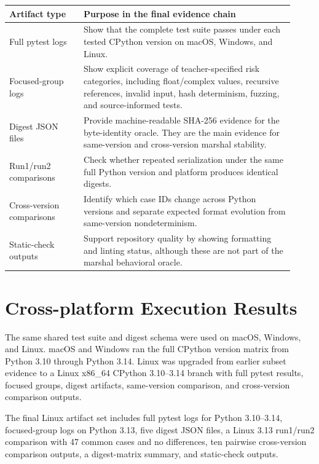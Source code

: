 \documentclass[10pt,a4paper]{article}
\begin{document}
\begin{longtable}{@{}L{0.24\linewidth}L{0.68\linewidth}@{}}
\toprule
\textbf{Artifact type} & \textbf{Purpose in the final evidence chain} \\
\midrule

Full pytest logs &
Show that the complete test suite passes under each tested CPython version on macOS, Windows, and Linux. \\

Focused-group logs &
Show explicit coverage of teacher-specified risk categories, including float/complex values, recursive references, invalid input, hash determinism, fuzzing, and source-informed tests. \\

Digest JSON files &
Provide machine-readable SHA-256 evidence for the byte-identity oracle. They are the main evidence for same-version and cross-version marshal stability. \\

Run1/run2 comparisons &
Check whether repeated serialization under the same full Python version and platform produces identical digests. \\

Cross-version comparisons &
Identify which case IDs change across Python versions and separate expected format evolution from same-version nondeterminism. \\

Static-check outputs &
Support repository quality by showing formatting and linting status, although these are not part of the marshal behavioral oracle. \\

\bottomrule
\end{longtable}
\endgroup

\section{Cross-platform Execution Results}

The same shared test suite and digest schema were used on macOS, Windows, and Linux. macOS and Windows ran the full CPython version matrix from Python 3.10 through Python 3.14. Linux was upgraded from earlier subset evidence to a Linux x86\_64 CPython 3.10--3.14 branch with full pytest results, focused groups, digest artifacts, same-version comparison, and cross-version comparison outputs.

The final Linux artifact set includes full pytest logs for Python 3.10--3.14, focused-group logs on Python 3.13, five digest JSON files, a Linux 3.13 run1/run2 comparison with 47 common cases and no differences, ten pairwise cross-version comparison outputs, a digest-matrix summary, and static-check outputs.
\end{document}
